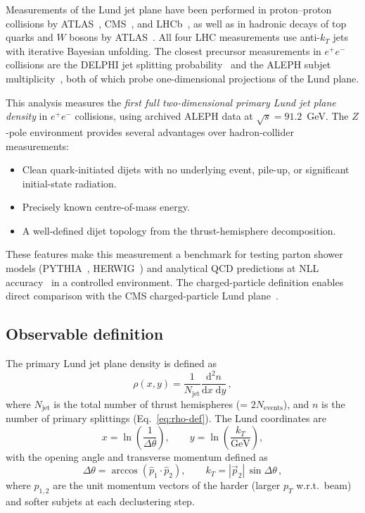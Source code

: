 \documentclass[11pt,a4paper]{article}
\begin{document}
Measurements of the Lund jet plane have been performed in
proton--proton collisions by
ATLAS~\cite{ATLAS:2020bbn},
CMS~\cite{CMS:2024mlf},
and LHCb~\cite{LHCb:2025viq},
as well as in hadronic decays of top quarks and $W$ bosons by
ATLAS~\cite{ATLAS:2024wqo}.
All four LHC measurements use anti-$k_T$ jets with iterative
Bayesian unfolding.  The closest precursor measurements in
$e^+e^-$ collisions are the DELPHI jet splitting
probability~\cite{DELPHI:2003yqh} and the ALEPH subjet
multiplicity~\cite{ALEPH:1998hhp}, both of which probe
one-dimensional projections of the Lund plane.

This analysis measures the \emph{first full two-dimensional primary
Lund jet plane density} in $e^+e^-$ collisions, using archived
ALEPH data at $\sqrt{s} = 91.2$~GeV.  The $Z$-pole environment
provides several advantages over hadron-collider measurements:
\begin{itemize}
\item Clean quark-initiated dijets with no underlying event, pile-up,
  or significant initial-state radiation.
\item Precisely known centre-of-mass energy.
\item A well-defined dijet topology from the thrust-hemisphere
  decomposition.
\end{itemize}
These features make this measurement a benchmark for testing parton
shower models (PYTHIA~\cite{Sjostrand:2014zea,Skands:2014pea},
HERWIG~\cite{Bellm:2015jjp}) and analytical QCD predictions at NLL
accuracy~\cite{Lifson:2020gua} in a controlled environment.  The
charged-particle definition enables direct comparison with the CMS
charged-particle Lund plane~\cite{CMS:2024mlf}.

\subsection{Observable definition}
\label{sec:obs-def}

The primary Lund jet plane density is defined as
\begin{equation}
  \rho(x, y) = \frac{1}{N_\text{jet}}
  \frac{\mathrm{d}^2 n}{\mathrm{d}x\;\mathrm{d}y}\,,
  \label{eq:rho-def}
\end{equation}
where $N_\text{jet}$ is the total number of thrust hemispheres
(= $2 N_\text{events}$), and $n$ is the number of primary
splittings (Eq.~\eqref{eq:rho-def}).  The Lund coordinates are
\begin{equation}
  x = \ln\!\left(\frac{1}{\Delta\theta}\right), \qquad
  y = \ln\!\left(\frac{k_T}{\text{GeV}}\right),
  \label{eq:coords}
\end{equation}
with the opening angle and transverse momentum defined as
\begin{equation}
  \Delta\theta = \arccos\!\left(\hat{p}_1 \cdot \hat{p}_2\right),
  \qquad
  k_T = |\vec{p}_2|\,\sin\Delta\theta\,,
  \label{eq:kt-dtheta}
\end{equation}
where $\hat{p}_{1,2}$ are the unit momentum vectors of the harder
(larger $p_T$ w.r.t.\ beam) and softer subjets at each declustering
step.
\end{document}
